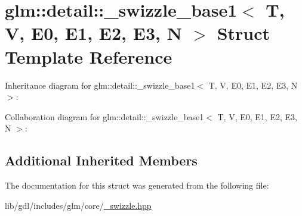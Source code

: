 \hypertarget{structglm_1_1detail_1_1__swizzle__base1}{}\section{glm\+:\+:detail\+:\+:\+\_\+swizzle\+\_\+base1$<$ T, V, E0, E1, E2, E3, N $>$ Struct Template Reference}
\label{structglm_1_1detail_1_1__swizzle__base1}


Inheritance diagram for glm\+:\+:detail\+:\+:\+\_\+swizzle\+\_\+base1$<$ T, V, E0, E1, E2, E3, N $>$\+:


Collaboration diagram for glm\+:\+:detail\+:\+:\+\_\+swizzle\+\_\+base1$<$ T, V, E0, E1, E2, E3, N $>$\+:
\subsection*{Additional Inherited Members}


The documentation for this struct was generated from the following file\+:\begin{DoxyCompactItemize}
\item 
lib/gdl/includes/glm/core/\hyperlink{__swizzle_8hpp}{\+\_\+swizzle.\+hpp}\end{DoxyCompactItemize}

